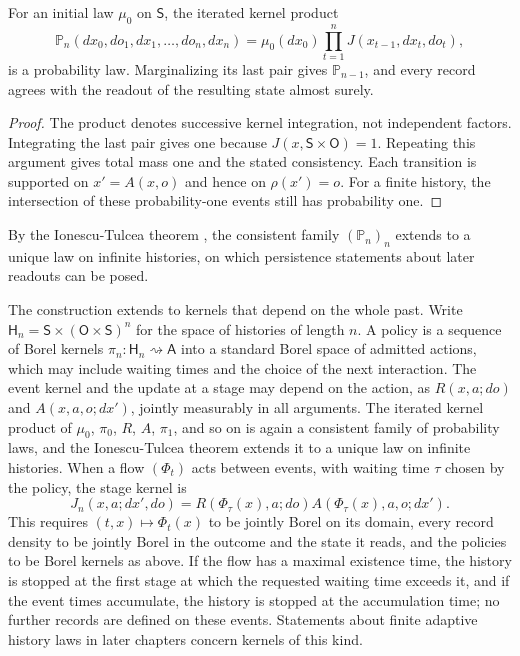 For an initial law $\mu_0$ on $\mathsf S$, the iterated kernel product
\begin{equation}
\mathbb P_n(dx_0,do_1,dx_1,\ldots,do_n,dx_n)
=\mu_0(dx_0)\prod_{t=1}^nJ(x_{t-1},dx_t,do_t),
\label{eq:registered-history}
\end{equation}
is a probability law. Marginalizing its last pair gives $\mathbb P_{n-1}$, and every record agrees with the readout of the resulting state almost surely.
\begin{proof}
The product denotes successive kernel integration, not independent factors. Integrating the last pair gives one because $J(x,\mathsf S\times\mathsf O)=1$. Repeating this argument gives total mass one and the stated consistency. Each transition is supported on $x'=A(x,o)$ and hence on $\rho(x')=o$. For a finite history, the intersection of these probability-one events still has probability one.
\end{proof}

By the Ionescu-Tulcea theorem \citep{Kallenberg2021}, the consistent family $(\mathbb P_n)_n$ extends to a unique law on infinite histories, on which persistence statements about later readouts can be posed.

The construction extends to kernels that depend on the whole past. Write $\mathsf H_n=\mathsf S\times(\mathsf O\times\mathsf S)^n$ for the space of histories of length $n$. A policy is a sequence of Borel kernels $\pi_n:\mathsf H_n\rightsquigarrow\mathsf A$ into a standard Borel space of admitted actions, which may include waiting times and the choice of the next interaction. The event kernel and the update at a stage may depend on the action, as $R(x,a;do)$ and $A(x,a,o;dx')$, jointly measurably in all arguments. The iterated kernel product of $\mu_0$, $\pi_0$, $R$, $A$, $\pi_1$, and so on is again a consistent family of probability laws, and the Ionescu-Tulcea theorem extends it to a unique law on infinite histories. When a flow $(\Phi_t)$ acts between events, with waiting time $\tau$ chosen by the policy, the stage kernel is
\begin{equation}
J_n(x,a;dx',do)=R(\Phi_\tau(x),a;do)A(\Phi_\tau(x),a,o;dx').
\label{eq:record-flow-kernel}
\end{equation}
This requires $(t,x)\mapsto\Phi_t(x)$ to be jointly Borel on its domain, every record density to be jointly Borel in the outcome and the state it reads, and the policies to be Borel kernels as above. If the flow has a maximal existence time, the history is stopped at the first stage at which the requested waiting time exceeds it, and if the event times accumulate, the history is stopped at the accumulation time; no further records are defined on these events. Statements about finite adaptive history laws in later chapters concern kernels of this kind.

